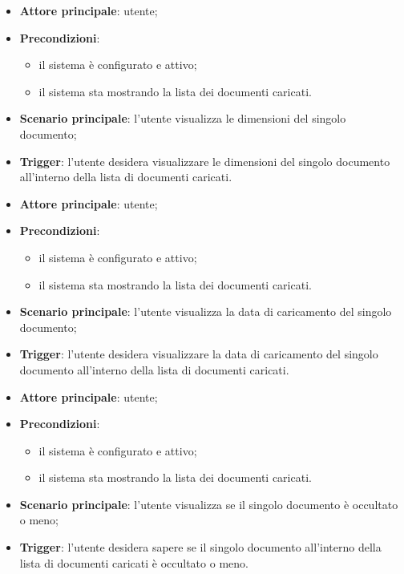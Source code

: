 \documentclass[10pt, a4paper]{article}
\begin{document}
    \begin{itemize}
        \item \textbf{Attore principale}: utente;
        \item \textbf{Precondizioni}:
            \begin{itemize}
                \item il sistema è configurato e attivo;
                \item il sistema sta mostrando la lista dei documenti caricati.
            \end{itemize}
        \item \textbf{Scenario principale}: l'utente visualizza le dimensioni del singolo documento;
        \item \textbf{Trigger}: l’utente desidera visualizzare le dimensioni del singolo documento all’interno della lista di documenti caricati.
    \end{itemize}

    \begin{itemize}
        \item \textbf{Attore principale}: utente;
        \item \textbf{Precondizioni}:
            \begin{itemize}
                \item il sistema è configurato e attivo;
                \item il sistema sta mostrando la lista dei documenti caricati.
            \end{itemize}
        \item \textbf{Scenario principale}: l'utente visualizza la data di caricamento del singolo documento;
        \item \textbf{Trigger}: l’utente desidera visualizzare la data di caricamento del singolo documento all’interno della lista di documenti caricati.
    \end{itemize}

    \begin{itemize}
        \item \textbf{Attore principale}: utente;
        \item \textbf{Precondizioni}:
            \begin{itemize}
                \item il sistema è configurato e attivo;
                \item il sistema sta mostrando la lista dei documenti caricati.
            \end{itemize}
        \item \textbf{Scenario principale}: l'utente visualizza se il singolo documento è occultato o meno;
        \item \textbf{Trigger}: l’utente desidera sapere se il singolo documento all’interno della lista di documenti caricati è occultato o meno.
    \end{itemize}
    
\end{document}
